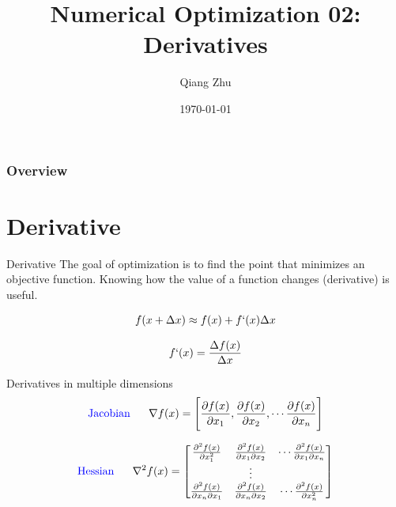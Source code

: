 \documentclass{beamer}
\title[Optimization]{Numerical Optimization 02: Derivatives} %
\author{Qiang Zhu} %
\institute[University of Nevada Las Vegas] %
{
University of Nevada Las Vegas\\ %
\medskip
}
\date{\today} %
\begin{document}
\begin{frame}
\titlepage %
\end{frame}

\begin{frame}
\frametitle{Overview} %
\tableofcontents %
\end{frame}



\section{Derivative}
\begin{frame}{Derivative}
The goal of optimization is to find the point that minimizes an objective function. Knowing how the value of a function changes (derivative) is useful.

 \begin{equation*}
     f(x + \Delta x) \approx f(x) + f`(x)\Delta x
 \end{equation*}
 
\begin{equation*}
    f`(x) = \frac{\Delta f(x)}{\Delta x}
\end{equation*}

Derivatives in multiple dimensions
\begin{equation*}
\textrm{\textcolor{blue}{Jacobian}}~~~~~     \nabla f(x) = \Bigg[\frac{\partial f(x)}{\partial x_1}, \frac{\partial f(x)}{\partial x_2},  \cdots \frac{\partial f(x)}{\partial x_n} \Bigg]
\end{equation*}

\begin{equation*}
\textrm{\textcolor{blue}{Hessian}}~~~~~    \nabla^2 f(x) = 
    \begin{bmatrix}
\frac{\partial^2 f(x)}{\partial x_1^2 } & \frac{\partial^2 f(x)}{\partial x_1 \partial x_2 } & \cdots \frac{\partial^2 f(x)}{\partial x_1 \partial x_n }\\
 & \vdots & \\
\frac{\partial^2 f(x)}{\partial x_n \partial x_1} & \frac{\partial^2 f(x)}{\partial x_n \partial x_2 } & \cdots \frac{\partial^2 f(x)}{\partial x_n^2 } \\
\end{bmatrix}
\end{equation*}
\end{frame}
\end{document}
